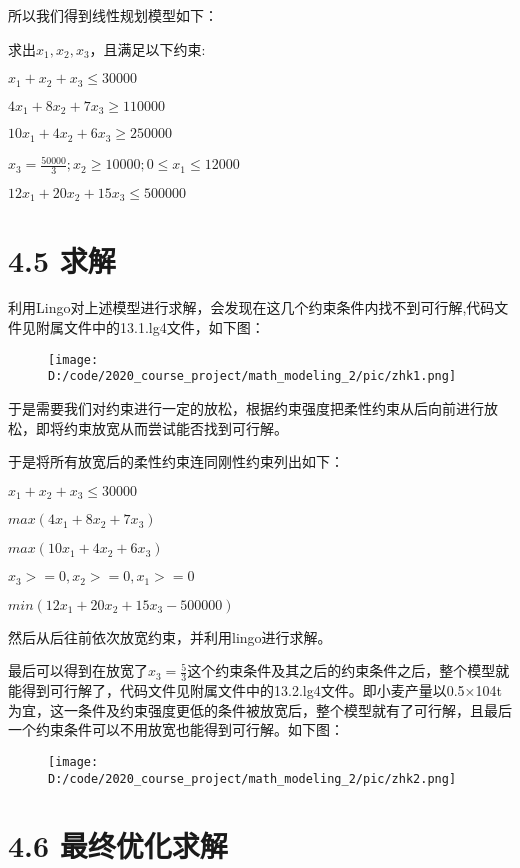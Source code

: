 \documentclass[bachelor,openany,oneside,color]{buaathesis}
\begin{document}
所以我们得到线性规划模型如下：

求出\(x_1,x_2,x_3\)，且满足以下约束:

\(x_1+x_2+x_3\leq 30000\)

\(4x_1+8x_2+7x_3\geq110000\)

\(10x_1+4x_2+6x_3\geq250000\)

\(x_3=\frac{50000}{3};x_2\geq10000;0\leq x_1\leq12000\)

\(12x_1+20x_2+15x_3\leq500000\)

\hypertarget{header-n352}{%
\section{4.5 求解}\label{header-n352}}

利用Lingo对上述模型进行求解，会发现在这几个约束条件内找不到可行解,代码文件见附属文件中的13.1.lg4文件，如下图：

\begin{figure}
\centering
\texttt{[image: D:/code/2020\_course\_project/math\_modeling\_2/pic/zhk1.png]}
\caption{}
\end{figure}

于是需要我们对约束进行一定的放松，根据约束强度把柔性约束从后向前进行放松，即将约束放宽从而尝试能否找到可行解。

于是将所有放宽后的柔性约束连同刚性约束列出如下：

\(x_1+x_2+x_3\leq30000\)

\(max(4x_1+8x_2+7x_3)\)

\(max(10x_1+4x_2+6x_3)\)

\(x_3>=0,x_2>=0,x_1>=0\)

\(min(12x_1+20x_2+15x_3-500000)\)

然后从后往前依次放宽约束，并利用lingo进行求解。

最后可以得到在放宽了\(x_3=\frac{5}{3}\)这个约束条件及其之后的约束条件之后，整个模型就能得到可行解了，代码文件见附属文件中的13.2.lg4文件。即小麦产量以0.5×104t为宜，这一条件及约束强度更低的条件被放宽后，整个模型就有了可行解，且最后一个约束条件可以不用放宽也能得到可行解。如下图：

\begin{figure}
\centering
\texttt{[image: D:/code/2020\_course\_project/math\_modeling\_2/pic/zhk2.png]}
\caption{}
\end{figure}

\hypertarget{header-n365}{%
\section{4.6 最终优化求解}\label{header-n365}}
\end{document}
